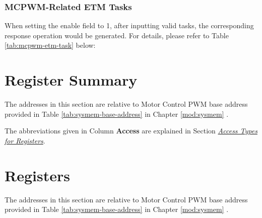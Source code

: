\documentclass[main\_\_EN.tex]{subfiles}
\begin{document}


\subsubsection{MCPWM-Related ETM Tasks}
When setting the enable field to 1, after inputting valid tasks, the corresponding response operation would be generated. For details, please refer to Table \ref{tab:mcpwm-etm-task} below:






\clearpage
\hypertarget{mcpwm-reg-summ}{}
\section{Register Summary}
\label{sec:mcpwm-reg-summ}

The addresses in this section are relative to Motor Control PWM base address provided in Table \ref{tab:sysmem-base-address} in Chapter \ref{mod:sysmem} \textit{}.

The abbreviations given in Column \textbf{Access} are explained in Section \hyperref[glossary-access-types]{\textit{Access Types for Registers}}.






\clearpage
\section{Registers}

The addresses in this section are relative to Motor Control PWM base address provided in Table \ref{tab:sysmem-base-address} in Chapter \ref{mod:sysmem} \textit{}.


\end{document}

